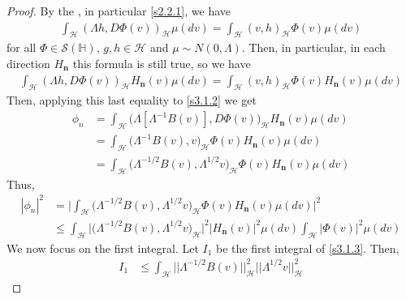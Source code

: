 \documentclass[review, onefignum, onetabnum]{siamart171218}
\begin{document}
\begin{proof}
By the , in particular \eqref{s2.2.1}, we have
\begin{align*}
 \int_{\mathcal{H}} (\Lambda h,D\Phi(v))_{\mathcal{H}}  \mu(dv) = 
\int_{\mathcal{H}} (v,h)_{\mathcal{H}} \Phi(v)  \mu(dv)
\end{align*}
for all $\Phi\in \mathcal{S}(\mathbb{H})$, $g,h\in \mathcal{H}$ and $\mu\sim 
N(0,\Lambda)$. Then, in particular, in each direction $H_{\mathbf{n}}$ 
this formula is still true, so we have
\begin{align*}
 \int_{\mathcal{H}} (\Lambda h,D\Phi(v))_{\mathcal{H}} H_{\mathbf{n}}(v)  
\mu(dv) = 
 \int_{\mathcal{H}} (v,h)_{\mathcal{H}} \Phi(v) H_{\mathbf{n}}(v) \mu(dv)
\end{align*}
Then, applying this last equality to \eqref{s3.1.2} we get
\begin{align}
 \phi_n &=\int_{\mathcal{H}} 
\big(\Lambda[\Lambda^{-1}B(v)],D\Phi(v)\big)_{\mathcal{H}} H_{\mathbf{n}}(v) 
\mu(dv)\nonumber\\
 &= \int_{\mathcal{H}} \big(\Lambda^{-1}B(v),v \big)_{\mathcal{H}} \Phi(v) 
H_{\mathbf{n}}(v) \mu(dv)\nonumber\\
 &= \int_{\mathcal{H}} \big(\Lambda^{-1/2}B(v),\Lambda^{1/2}v 
\big)_{\mathcal{H}} \Phi(v) H_{\mathbf{n}}(v) \mu(dv)\nonumber
 \end{align}
Thus,
\begin{equation}
    \label{s3.1.3}
    \begin{aligned}
        |\phi_n |^2 &= 
            \Bigg|
                \int_{\mathcal{H}} 
                    \big(
                        \Lambda^{-1/2}B(v),\Lambda^{1/2}v 
                    \big)_{\mathcal{H}} \Phi(v) 
                    H_{\mathbf{n}}(v) \mu(dv)
            \Bigg|^2
            \\
            &\le 
            \int_{\mathcal{H}}
            \big| 
                \big(
                    \Lambda^{-1/2}B(v),\Lambda^{1/2} v 
                \big)_{\mathcal{H}}
            \big|^2  
            \big|
                H_{\mathbf{n}}(v)
            \big|^2 \mu(dv)
            \int_{\mathcal{H}}
            \big|
                \Phi(v)
            \big|^2  \mu(dv)
     \end{aligned}
\end{equation}
We now focus on the first integral. Let $I_1$ be the first integral of 
\eqref{s3.1.3}. Then, 
\begin{align*}
I_1&\le \int_{\mathcal{H}}\big|\big|\Lambda^{-1/2}B(v) 
\big|\big|_{\mathcal{H}}^2  
\big|\big|\Lambda^{1/2}v \big|\big|_{\mathcal{H}}^2 

\end{align*}
\end{proof}
\end{document}
